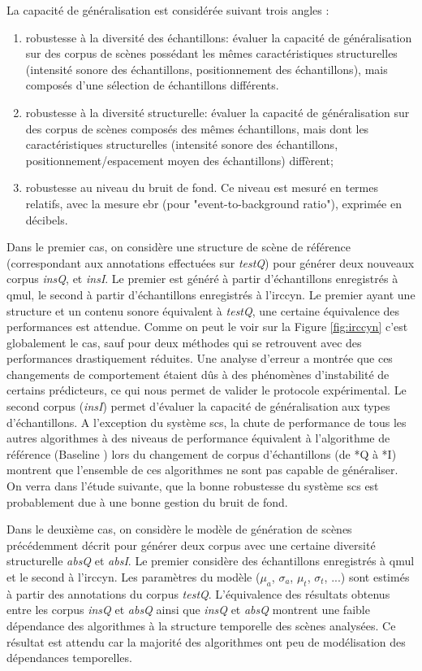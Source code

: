 La capacité de généralisation est considérée suivant trois angles :
\begin{enumerate}
  \item robustesse à la diversité des échantillons: évaluer la capacité de généralisation sur des corpus de scènes possédant les mêmes caractéristiques structurelles (intensité sonore des échantillons, positionnement des échantillons), mais composés d'une sélection de échantillons différents.
  \item robustesse à la diversité structurelle: évaluer la capacité de généralisation sur des corpus de scènes composés des mêmes échantillons, mais dont les caractéristiques structurelles (intensité sonore des échantillons, positionnement/espacement moyen des échantillons) diffèrent;
  \item robustesse au niveau du bruit de fond. Ce niveau est mesuré en termes relatifs, avec la mesure ebr (pour "event-to-background ratio"), exprimée en décibels.
\end{enumerate}

Dans le premier cas, on considère une structure de scène de référence (correspondant aux annotations effectuées sur \emph{testQ}) pour générer deux nouveaux corpus \emph{insQ}, et \emph{insI}. Le premier est généré à partir d'échantillons enregistrés à qmul, le second à partir d'échantillons enregistrés à l'irccyn. Le premier ayant une structure et un contenu sonore équivalent à \emph{testQ}, une certaine équivalence des performances est attendue. Comme on peut le voir sur la Figure \ref{fig:irccyn} c'est globalement le cas, sauf pour deux méthodes qui se retrouvent avec des performances drastiquement réduites. Une analyse d'erreur a montrée que ces changements de comportement étaient dûs à des phénomènes d'instabilité de certains prédicteurs, ce qui nous permet de valider le protocole expérimental. Le second corpus (\emph{insI}) permet d'évaluer la capacité de généralisation aux types d'échantillons. A l'exception du système scs, la chute de performance de tous les autres algorithmes à des niveaus de performance équivalent à l'algorithme de référence (\og Baseline \fg) lors du changement de corpus d'échantillons (de *Q à *I) montrent que l'ensemble de ces algorithmes ne sont pas capable de généraliser. On verra dans l'étude suivante, que la bonne robustesse du système scs est probablement due à une bonne gestion du bruit de fond.

Dans le deuxième cas, on considère le modèle de génération de scènes précédemment décrit pour générer deux corpus avec une certaine diversité structurelle \emph{absQ} et \emph{absI}. Le premier considère des échantillons enregistrés à qmul et le second à l'irccyn. Les paramètres du modèle ($\mu_a$, $\sigma_a$, $\mu_t$, $\sigma_t$, ...) sont estimés à partir des annotations du corpus \emph{testQ}. L'équivalence des résultats obtenus entre les corpus \emph{insQ} et \emph{absQ} ainsi que \emph{insQ} et \emph{absQ} montrent une faible dépendance des algorithmes à la structure temporelle des scènes analysées. Ce résultat est attendu car la majorité des algorithmes ont peu de modélisation des dépendances temporelles.

